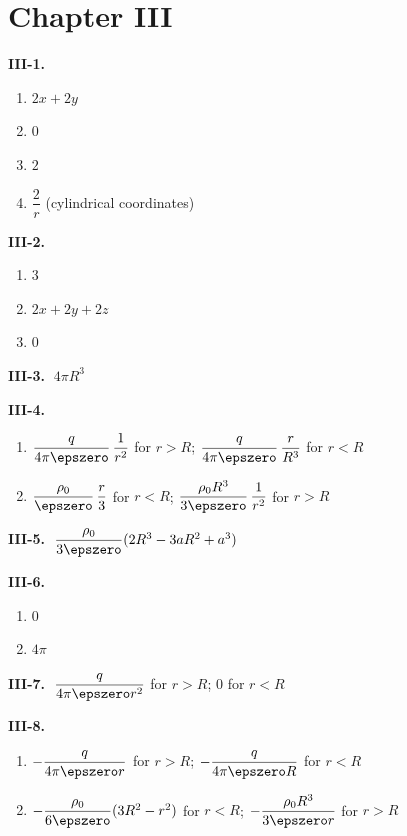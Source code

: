 \section*{Chapter III}

\textbf{III-1.}
\begin{enumerate}[label=(\alph*)]
  \item $2x + 2y$
  \item $0$
  \item $2$
  \item $\dfrac{2}{r}$ \;(cylindrical coordinates)
\end{enumerate}

\medskip
\textbf{III-2.}
\begin{enumerate}[label=(\alph*)]
  \item $3$
  \item $2x + 2y + 2z$
  \item $0$
\end{enumerate}

\medskip
\textbf{III-3.} $\;4\pi R^3$

\medskip
\textbf{III-4.}
\begin{enumerate}[label=(\alph*)]
  \item $\dfrac{q}{4\pi\epszero}\,\dfrac{1}{r^2}$ for $r > R$; \quad
        $\dfrac{q}{4\pi\epszero}\,\dfrac{r}{R^3}$ for $r < R$
  \item $\dfrac{\rho_0}{\epszero}\,\dfrac{r}{3}$ for $r < R$; \quad
        $\dfrac{\rho_0 R^3}{3\epszero}\,\dfrac{1}{r^2}$ for $r > R$
\end{enumerate}

\medskip
\textbf{III-5.} $\;\dfrac{\rho_0}{3\epszero}(2R^3 - 3aR^2 + a^3)$

\medskip
\textbf{III-6.}
\begin{enumerate}[label=(\alph*)]
  \item $0$
  \item $4\pi$
\end{enumerate}

\medskip
\textbf{III-7.} $\;\dfrac{q}{4\pi\epszero r^2}$ for $r > R$; \quad $0$ for $r < R$

\medskip
\textbf{III-8.}
\begin{enumerate}[label=(\alph*)]
  \item $-\dfrac{q}{4\pi\epszero r}$ for $r > R$; \quad
        $-\dfrac{q}{4\pi\epszero R}$ for $r < R$
  \item $-\dfrac{\rho_0}{6\epszero}(3R^2 - r^2)$ for $r < R$; \quad
        $-\dfrac{\rho_0 R^3}{3\epszero r}$ for $r > R$
\end{enumerate}


